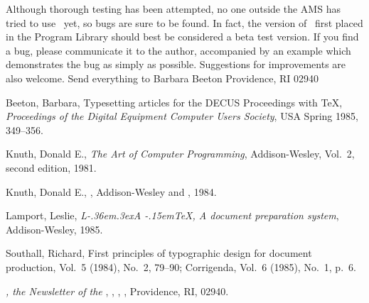 Although thorough testing has been attempted, no one outside the AMS has
tried to use \DP\ yet, so bugs are sure to be found.  In fact,
the version of \DP\ first placed in the Program Library should best
be considered a beta test version.  If you find a bug, please
communicate it to the author, accompanied by an example which
demonstrates the bug as simply as possible.  Suggestions for
improvements are also welcome.  Send everything to\break
{\obeylines %
        \indent Barbara Beeton
        \AMS
        Providence, RI 02940
}











\begin{thebibliography}{ACP}

 Beeton, Barbara, Typesetting articles for the DECUS
        Proceedings with \TeX, {\sl Proceedings of the Digital Equipment
        Computer Users Society}, USA Spring 1985, 349--356.

 Knuth, Donald E., {\sl The Art of Computer Programming},
        Addison-Wesley, Vol.~2, second edition, 1981.

 Knuth, Donald E., \TB, Addison-Wesley and \AMS, 1984.

 Lamport, Leslie, {\sl L\kern-.36em\raise.3ex\hbox{\small A}%
        \kern-.15em\TeX, A document preparation system}, Addison-Wesley,
        1985.

 Southall, Richard, First principles of typographic design
        for document production, {\sl\tub\/} Vol.~5 (1984), No.~2, 79--90;
        Corrigenda, Vol.~6 (1985), No.~1, p.~6.

 {\sl\tub, the Newsletter of the \TUG}, \TUG, \careof\AMS,
        , Providence, RI, 02940.

\end{thebibliography}



